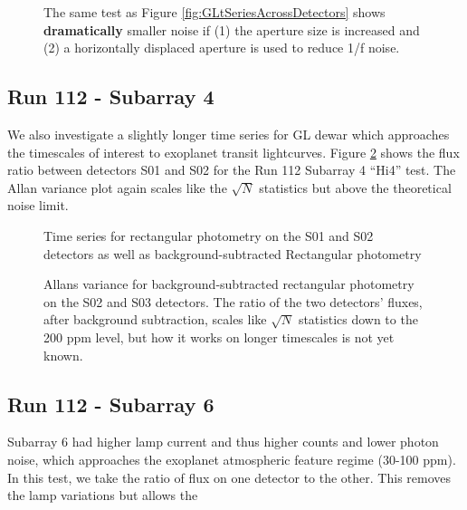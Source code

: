 \documentclass{aastex62}
\begin{document}
\begin{figure}
\caption{The same test as Figure \ref{fig:GLtSeriesAcrossDetectors} shows {\bf dramatically} smaller noise if (1) the aperture size is increased and (2) a horizontally displaced aperture is used to reduce 1/f noise.}\label{fig:GLtSeriesRun112}
\end{figure}

\clearpage

\subsection{Run 112 - Subarray 4}
We also investigate a slightly longer time series for GL dewar which approaches the timescales of interest to exoplanet transit lightcurves.
Figure \ref{fig:GLtSeriesRun112} shows the flux ratio between detectors S01 and S02 for the Run 112 Subarray 4 ``Hi4'' test.
The Allan variance plot again scales like the $\sqrt{N}$ statistics but above the theoretical noise limit.

\begin{figure}
\caption{Time series for rectangular photometry on the S01 and S02 detectors as well as background-subtracted Rectangular photometry}\label{fig:GLtSeriesRun112}
\end{figure}

\begin{figure}
\caption{Allans variance for background-subtracted rectangular photometry on the S02 and S03 detectors.
The ratio of the two detectors' fluxes, after background subtraction, scales like $\sqrt{N}$ statistics down to the 200 ppm level, but how it works on longer timescales is not yet known.}\label{fig:GLAllanVarianceAcrossDetectors}
\end{figure}

\subsection{Run 112 - Subarray 6}
Subarray 6 had higher lamp current and thus higher counts and lower photon noise, which approaches the exoplanet atmospheric feature regime (30-100 ppm).
In this test, we take the ratio of flux on one detector to the other.
This removes the lamp variations but allows the 
\end{document}
